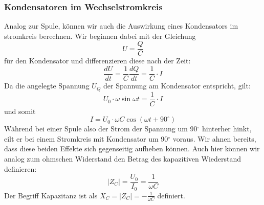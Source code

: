 \documentclass[10pt,a4paper]{article}
\newcommand{\degree}{$^\circ$}
\begin{document}
\subsubsection{Kondensatoren im Wechselstromkreis}
Analog zur Spule, können wir auch die Auswirkung eines Kondensators im stromkreis berechnen. %
Wir beginnen dabei mit der Gleichung
\begin{equation}
U = \frac{Q}{C}
\end{equation}
für den Kondensator und differenzieren diese nach der Zeit:
\begin{equation}
\frac{dU}{dt} = \frac{1}{C}\frac{dQ}{dt} = \frac{1}{C} \cdot I
\end{equation}
Da die angelegte Spannung $U_Q$ der Spannung am Kondensator entspricht, gilt:
\begin{equation}
U_0\cdot \omega \sin \omega t = \frac{1}{C} \cdot I
\end{equation}
und somit
\begin{equation}
I = U_0\cdot \omega C \cos\left( \omega t + 90^\circ\right)
\end{equation}
Während bei einer Spule also der Strom der Spannung um \unit{90}{\degree} hinterher hinkt, eilt er bei einem Stromkreis mit Kondensator um \unit{90}{\degree} voraus. Wir ahnen bereits, dass diese beiden Effekte sich gegenseitig aufheben können.
Auch hier können wir analog zum ohmschen Widerstand den Betrag des kapazitiven Wiederstand definieren:
\begin{equation}
\left|Z_C\right| = \frac{U_0}{I_0} = \frac{1}{\omega C}
\end{equation}
Der Begriff Kapazitanz ist als $X_C = \left|Z_C\right| = -\frac{1}{\omega C}$ definiert.
\end{document}
